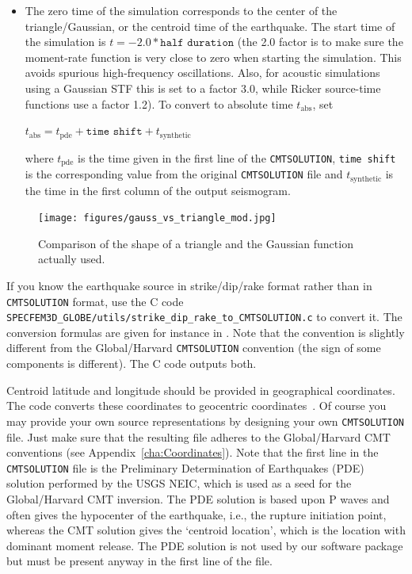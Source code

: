 \begin{itemize}
\item The zero time of the simulation corresponds to the center of the triangle/Gaussian,
or the centroid time of the earthquake. The start time of the simulation
is $t=-2.0*\texttt{half duration}$ (the 2.0 factor is to make sure the moment-rate function is very close to zero
when starting the simulation. This avoids spurious high-frequency oscillations.
Also, for acoustic simulations using a Gaussian STF this is set to a factor 3.0, while Ricker source-time functions use a factor 1.2).
To convert to absolute time $t_{\mathrm{abs}}$, set
%
\begin{lyxcode}
$t_{\mathrm{abs}}=t_{\mathrm{pde}}+\texttt{time shift}+t_{\mathrm{synthetic}}$
\end{lyxcode}

where $t_{\mathrm{pde}}$ is the time given in the first line of the
\texttt{CMTSOLUTION}, \texttt{time shift} is the corresponding value
from the original \texttt{CMTSOLUTION} file and $t_{\mathrm{synthetic}}$
is the time in the first column of the output seismogram.
\end{itemize}
%
\begin{figure}[htp]
\begin{centering}
\texttt{[image: figures/gauss\_vs\_triangle\_mod.jpg]}
\par
\end{centering}
\caption{Comparison of the shape of a triangle and the Gaussian function actually used.}
\label{fig:gauss.vs.triangle}
\end{figure}


If you know the earthquake source in strike/dip/rake format rather
than in \texttt{CMTSOLUTION} format, use the C code \texttt{SPECFEM3D\_GLOBE/utils/strike\_dip\_rake\_to\_CMTSOLUTION.c}
to convert it. The conversion formulas are given for instance in \citet{AkRi80}.
Note that the \citet{AkRi80} convention is slightly different from
the Global/Harvard \texttt{CMTSOLUTION} convention (the sign of some components
is different). The C code outputs both.\newline


Centroid latitude and longitude should be provided in geographical
coordinates. The code converts these coordinates to geocentric coordinates~\citep{DaTr98}.
Of course you may provide your own source representations by designing
your own \texttt{CMTSOLUTION} file. Just make sure that the resulting
file adheres to the Global/Harvard CMT conventions (see Appendix~\ref{cha:Coordinates}).
Note that the first line in the \texttt{CMTSOLUTION} file is the Preliminary
Determination of Earthquakes (PDE) solution performed by the USGS
NEIC, which is used as a seed for the Global/Harvard CMT inversion. The PDE
solution is based upon P waves and often gives the hypocenter of the
earthquake, i.e., the rupture initiation point, whereas the CMT solution
gives the `centroid location', which is the location with dominant
moment release. The PDE solution is not used by our software package
but must be present anyway in the first line of the file.\newline


